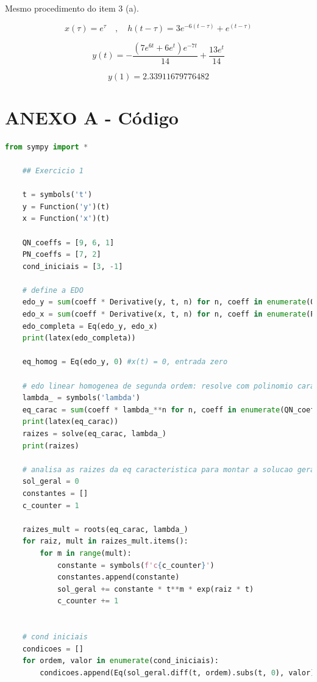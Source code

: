 \documentclass[12pt]{scrartcl}
\begin{document}
Mesmo procedimento do item 3 (a). 

\[ x(\tau) = e^{\tau} \quad , \quad h(t - \tau) = 3 e^{-6(t - \tau)} + e^{(t - \tau)} \]

\[ y(t) = - \frac{\left(7 e^{6 t} + 6 e^{t}\right) e^{- 7 t}}{14} + \frac{13 e^{t}}{14} \]

\[ y(1) = 2.33911679776482 \]

\newpage

\section*{ANEXO A - Código}

\begin{lstlisting}[language=Python, breaklines=true, basicstyle=\scriptsize]
    from sympy import *

    ## Exercicio 1
    
    t = symbols('t')
    y = Function('y')(t)
    x = Function('x')(t)
    
    QN_coeffs = [9, 6, 1]
    PN_coeffs = [7, 2]
    cond_iniciais = [3, -1]
    
    # define a EDO
    edo_y = sum(coeff * Derivative(y, t, n) for n, coeff in enumerate(QN_coeffs))
    edo_x = sum(coeff * Derivative(x, t, n) for n, coeff in enumerate(PN_coeffs))
    edo_completa = Eq(edo_y, edo_x)
    print(latex(edo_completa))
    
    eq_homog = Eq(edo_y, 0) #x(t) = 0, entrada zero
    
    # edo linear homogenea de segunda ordem: resolve com polinomio caracteristico
    lambda_ = symbols('lambda')
    eq_carac = sum(coeff * lambda_**n for n, coeff in enumerate(QN_coeffs))
    print(latex(eq_carac))
    raizes = solve(eq_carac, lambda_)
    print(raizes)
    
    # analisa as raizes da eq caracteristica para montar a solucao geral
    sol_geral = 0
    constantes = []
    c_counter = 1
    
    raizes_mult = roots(eq_carac, lambda_)
    for raiz, mult in raizes_mult.items():
        for m in range(mult):
            constante = symbols(f'c{c_counter}')
            constantes.append(constante)
            sol_geral += constante * t**m * exp(raiz * t)
            c_counter += 1
    
    
    # cond iniciais
    condicoes = []
    for ordem, valor in enumerate(cond_iniciais):
        condicoes.append(Eq(sol_geral.diff(t, ordem).subs(t, 0), valor))
    

\end{lstlisting}
\end{document}
